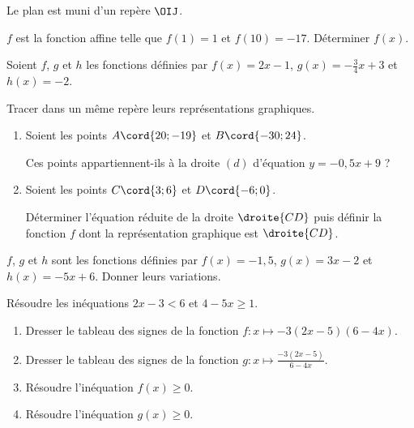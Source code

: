 \begin{centered}
Le plan est muni d'un repère $\OIJ$.
\end{centered}
%
%
%
\begin{exr}
$f$ est la fonction affine telle que $f(1)=1$ et $f(10)=-17$. Déterminer $f(x)$.
\end{exr}
%
%
\begin{exr}
Soient $f$, $g$ et $h$ les fonctions définies par  $f(x)=2x-1$, $g(x)=-\frac34x+3$ et $h(x) = -2$.

Tracer dans un même repère leurs représentations graphiques.
\end{exr}
%
%
%
\begin{exr}
\begin{enumerate}
\item Soient les points $A\cord{20;-19}$ et $B\cord{-30;24}$. 

Ces points appartiennent-ils à la droite $(d)$ d'équation $y=-0,5x+9$ ?
\item Soient les points $C\cord{3;6}$ et $D\cord{-6;0}$. 

Déterminer l'équation réduite de la droite $\droite{CD}$ puis définir la fonction  $f$ dont la représentation graphique est $\droite{CD}$.
\end{enumerate}
\end{exr}
%
%
%
\begin{exr}
$f$, $g$ et $h$ sont les fonctions définies par $f(x)=-1,5$, $g(x)=3x-2$ et $h(x)=-5x+6$. Donner leurs variations.
\end{exr}

\begin{exr}
Résoudre les inéquations $2x-3<6$ et $4-5x\geqslant 1$.
\end{exr}
%
%
%
\begin{exr}
\begin{enumerate}
\item Dresser le tableau des signes de la fonction $f\colon x\mapsto -3(2x-5)(6-4x)$.
\item Dresser le tableau des signes de la fonction $g\colon x\mapsto \frac{-3(2x-5)}{6-4x}$.
\item Résoudre l'inéquation $f(x)\geqslant0$.
\item Résoudre l'inéquation $g(x)\geqslant0$.
\end{enumerate}
\end{exr}